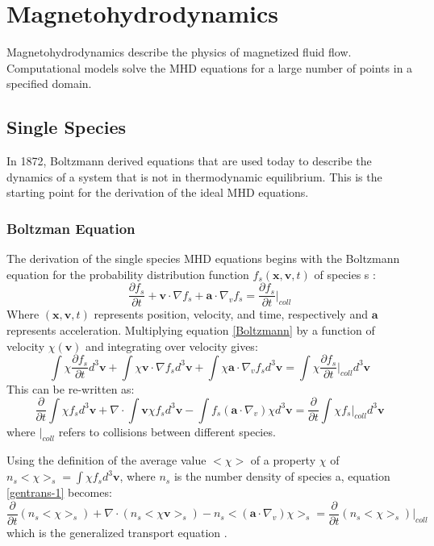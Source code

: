 \section{Magnetohydrodynamics}
\label{sec:mhd}
Magnetohydrodynamics describe the physics of magnetized fluid flow. Computational
models solve the MHD equations for a large number of points
in a specified domain.

\subsection{Single Species}
In 1872, Boltzmann derived equations that are used
today to describe the dynamics of a system that is not in thermodynamic
equilibrium. This is the starting point
for the derivation of the ideal MHD equations.
\subsubsection{Boltzman Equation}
The derivation of the single species MHD equations begins with the Boltzmann
equation for the probability distribution function
$f_s(\mathbf{x},\mathbf{v},t)$ of species s :
\begin{equation}
\frac{\partial f_s}{\partial t} + \mathbf{v} \cdot \nabla f_s + \mathbf{a}
\cdot \nabla_v f_s = \frac{\partial f_s}{\partial t}\bigg|_{coll}
\label{Boltzmann}
\end{equation}
Where $(\mathbf{x},\mathbf{v},t)$ represents position, velocity, and time,
respectively and $\mathbf{a}$ represents acceleration.
Multiplying equation \ref{Boltzmann} by a function of velocity
$\chi(\mathbf{v})$ and integrating over velocity gives:
\begin{equation}
\int \chi \frac{\partial f_s}{\partial t} d^3 \mathbf{v} + \int \chi \mathbf{v}
\cdot \nabla f_s d^3 \mathbf{v} + \int \chi \mathbf{a} \cdot \nabla_v f_s d^3
\mathbf{v} = \int \chi \frac{\partial f_s}{\partial t}\bigg|_{coll}  d^3
\mathbf{v}
\label{Boltzmann+1}
\end{equation}
This can be re-written as:
\begin{equation}
\frac{\partial}{\partial t}\int \chi f_s d^3 \mathbf{v} + \nabla \cdot \int
\mathbf{v} \chi f_s d^3 \mathbf{v} - \int f_s (\mathbf{a} \cdot
\nabla_v) \chi d^3 \mathbf{v} = \frac{\partial}{\partial t} \int \chi
f_s \bigg|_{coll} d^3 \mathbf{v}
\label{gentrans-1}
\end{equation}
where $\bigg|_{coll}$ refers to collisions between different species.

Using the definition of the average value $ < \chi >$ of a property $\chi$
of $n_s < \chi >_s = \int \chi f_s d^3 \mathbf{v}$, where $n_s$ is the number
density of species a, equation \ref{gentrans-1} becomes:
\begin{equation}
\frac{\partial}{\partial t}( n_s < \chi >_s) + \nabla \cdot (n_s < \chi
\mathbf{v} >_s) - n_s < ( \mathbf{a} \cdot \nabla_v) \chi >_s =
\frac{\partial}{\partial t} (n_s < \chi >_s)\bigg|_{coll}
\label{gentrans}
\end{equation}
which is the generalized transport equation \citep{Kominsky}.
